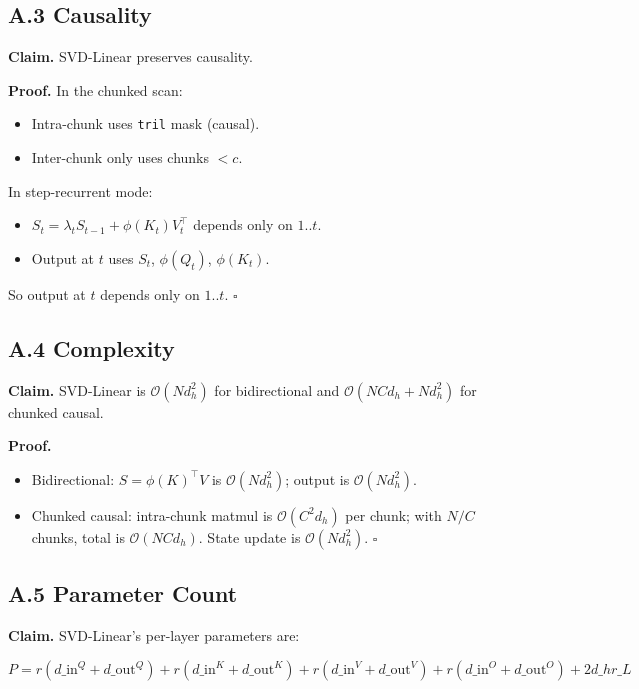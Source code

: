 \subsection{A.3 Causality}

\textbf{Claim.} SVD-Linear preserves causality.

\textbf{Proof.} In the chunked scan:
\begin{itemize}
\item Intra-chunk uses \texttt{tril} mask (causal).
\item Inter-chunk only uses chunks $< c$.

\end{itemize}
In step-recurrent mode:
\begin{itemize}
\item $S_t = \lambda_t S_{t-1} + \phi(K_t) V_t^\top$ depends only on $1..t$.
\item Output at $t$ uses $S_t$, $\phi(Q_t)$, $\phi(K_t)$.

\end{itemize}
So output at $t$ depends only on $1..t$. $\square$

\subsection{A.4 Complexity}

\textbf{Claim.} SVD-Linear is $\mathcal{O}(N d_h^2)$ for bidirectional and 
$\mathcal{O}(N C d_h + N d_h^2)$ for chunked causal.

\textbf{Proof.} 
\begin{itemize}
\item Bidirectional: $S = \phi(K)^\top V$ is $\mathcal{O}(N d_h^2)$; output
  is $\mathcal{O}(N d_h^2)$.
\item Chunked causal: intra-chunk matmul is $\mathcal{O}(C^2 d_h)$ per chunk;
  with $N/C$ chunks, total is $\mathcal{O}(N C d_h)$. State update is
  $\mathcal{O}(N d_h^2)$. $\square$

\end{itemize}
\subsection{A.5 Parameter Count}

\textbf{Claim.} SVD-Linear's per-layer parameters are:

\[
P = r(d\_\text{in}^Q + d\_\text{out}^Q) + r(d\_\text{in}^K + d\_\text{out}^K) + r(d\_\text{in}^V + d\_\text{out}^V) + r(d\_\text{in}^O + d\_\text{out}^O) + 2 d\_h r\_L
\]

